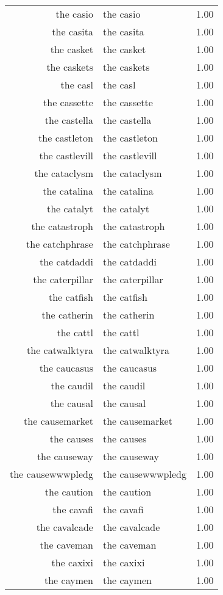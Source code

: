 \begin{table}[ht]
\begin{tabular}{rlr}
  the casio & the casio & 1.00 \\ 
  the casita & the casita & 1.00 \\ 
  the casket & the casket & 1.00 \\ 
  the caskets & the caskets & 1.00 \\ 
  the casl & the casl & 1.00 \\ 
  the cassette & the cassette & 1.00 \\ 
  the castella & the castella & 1.00 \\ 
  the castleton & the castleton & 1.00 \\ 
  the castlevill & the castlevill & 1.00 \\ 
  the cataclysm & the cataclysm & 1.00 \\ 
  the catalina & the catalina & 1.00 \\ 
  the catalyt & the catalyt & 1.00 \\ 
  the catastroph & the catastroph & 1.00 \\ 
  the catchphrase & the catchphrase & 1.00 \\ 
  the catdaddi & the catdaddi & 1.00 \\ 
  the caterpillar & the caterpillar & 1.00 \\ 
  the catfish & the catfish & 1.00 \\ 
  the catherin & the catherin & 1.00 \\ 
  the cattl & the cattl & 1.00 \\ 
  the catwalktyra & the catwalktyra & 1.00 \\ 
  the caucasus & the caucasus & 1.00 \\ 
  the caudil & the caudil & 1.00 \\ 
  the causal & the causal & 1.00 \\ 
  the causemarket & the causemarket & 1.00 \\ 
  the causes & the causes & 1.00 \\ 
  the causeway & the causeway & 1.00 \\ 
  the causewwwpledg & the causewwwpledg & 1.00 \\ 
  the caution & the caution & 1.00 \\ 
  the cavafi & the cavafi & 1.00 \\ 
  the cavalcade & the cavalcade & 1.00 \\ 
  the caveman & the caveman & 1.00 \\ 
  the caxixi & the caxixi & 1.00 \\ 
  the caymen & the caymen & 1.00 \\ 

\end{tabular}
\end{table}
